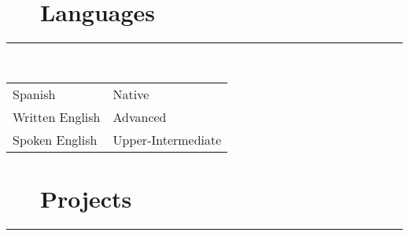 \documentclass{article}
\begin{document}
\section*{\faLanguage ~~ Languages}
\hrule

\
\newline
\

\begin{tabular}{l | l}
    Spanish & Native \\
    Written English & Advanced \\
    Spoken English & Upper-Intermediate
\end{tabular}

\section*{\faFileCodeO ~~ Projects}
\hrule
\
\end{document}
